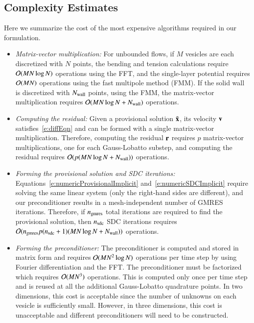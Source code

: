 \subsection{Complexity Estimates}
Here we summarize the cost of the most expensive algorithms required in
our formulation.
\begin{itemize}

\item \emph{Matrix-vector multiplication:}
For unbounded flows, if $M$ vesicles are each discretized with $N$
points, the bending and tension calculations require $\mathcal{O}(MN\log N)$
operations using the FFT, and the single-layer potential requires
$\mathcal{O}(MN)$ operations using the fast multipole method (FMM).  If the
solid wall is discretized with $N_{{\mathrm{wall}}}$ points, using the FMM, the
matrix-vector multiplication requires $\mathcal{O}(MN\log N + N_{{\mathrm{wall}}})$
operations.

\item \emph{Computing the residual:}
Given a provisional solution $\tilde{{\mathbf{x}}}$, its velocity ${\mathbf{v}}$
satisfies~\eqref{e:diffEqn} and can be
formed with a single matrix-vector multiplication.  Therefore,
computing the residual ${\mathbf{r}}$ requires $p$ matrix-vector
multiplications, one for each Gauss-Lobatto substep, and computing the
residual requires $\mathcal{O}(p(MN\log N + N_{{\mathrm{wall}}}))$ operations.

\item \emph{Forming the provisional solution and SDC iterations:}
Equations~\eqref{e:numericProvisionalImplicit}
and~\eqref{e:numericSDCImplicit} require solving the same linear system
(only the right-hand sides are different), and our preconditioner
results in a mesh-independent number of GMRES iterations.  Therefore,
if $n_{{\mathrm{gmres}}}$ total iterations are required to find the provisional
solution, then $n_{{\mathrm{sdc}}}$ SDC iterations requires
$\mathcal{O}(n_{{\mathrm{gmres}}}p(n_{{\mathrm{sdc}}}+1)(MN\log N + N_{{\mathrm{wall}}}))$ operations.  

\item \emph{Forming the preconditioner:} The preconditioner is computed
and stored in matrix form and requires $\mathcal{O}(MN^{2}\log N)$ operations
per time step by using Fourier differentiation and the FFT.  The
preconditioner must be factorized which requires $\mathcal{O}(MN^{3})$
operations.  This is computed only once per time step and is reused at
all the additional Gauss-Lobatto quadrature points.  In two dimensions,
this cost is acceptable since the number of unknowns on each vesicle is
sufficiently small.  However, in three dimensions, this cost is
unacceptable and different preconditioners will need to be constructed.
\end{itemize}


